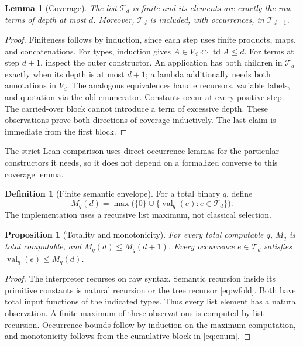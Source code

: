\documentclass[11pt]{article}
\newtheorem{lemma}[theorem]{Lemma}
\newtheorem{proposition}[theorem]{Proposition}
\theoremstyle{definition}
\newtheorem{definition}[theorem]{Definition}
\newcommand{\val}{\operatorname{val}}
\newcommand{\td}{\operatorname{td}}
\begin{document}
\begin{lemma}[Coverage]\label{lem:coverage}
The list $\mathcal T_d$ is finite and its elements are exactly the raw terms
of depth at most $d$. Moreover, $\mathcal T_d$ is included, with occurrences,
in $\mathcal T_{d+1}$.
\end{lemma}
\begin{proof}
Finiteness follows by induction, since each step uses finite products,
maps, and concatenations. For types, induction gives
$A\in V_d\iff\td A\le d$. For terms at step $d+1$, inspect the outer
constructor. An application has both children in $\mathcal T_d$ exactly when
its depth is at most $d+1$; a lambda additionally needs both annotations in
$V_d$. The analogous equivalences handle recursors, variable labels, and
quotation via the old enumerator. Constants occur at every positive step.
The carried-over block cannot introduce a term of excessive depth. These
observations prove both directions of coverage inductively. The last claim
is immediate from the first block.
\end{proof}

The strict Lean comparison uses direct occurrence lemmas for the particular
constructors it needs, so it does not depend on a formalized converse to this
coverage lemma.

\begin{definition}[Finite semantic envelope]\label{def:envelope}
For a total binary $q$, define
\begin{equation}\label{eq:envelope}
 M_q(d)=\max\bigl(\{0\}\cup
       \{\val_q(e):e\in\mathcal T_d\}\bigr).
\end{equation}
The implementation uses a recursive list maximum, not classical selection.
\end{definition}

\begin{proposition}[Totality and monotonicity]
For every total computable $q$, $M_q$ is total computable, and
$M_q(d)\le M_q(d+1)$. Every occurrence $e\in\mathcal T_d$ satisfies
$\val_q(e)\le M_q(d)$.
\end{proposition}
\begin{proof}
The interpreter recurses on raw syntax. Semantic recursion inside its
primitive constants is natural recursion or the tree recursor
\eqref{eq:wfold}. Both have total input functions of the indicated types.
Thus every list element has a natural observation. A finite maximum of these
observations is computed by list recursion. Occurrence bounds follow by
induction on the maximum computation, and monotonicity follows from the
cumulative block in \eqref{eq:enum}.
\end{proof}
\end{document}
